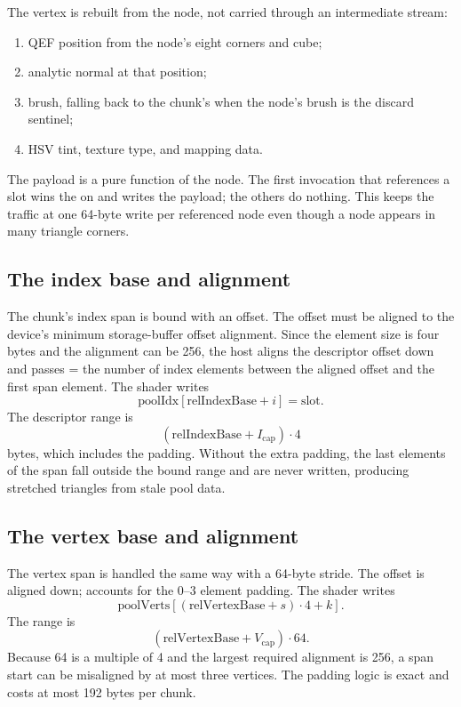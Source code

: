 The vertex is rebuilt from the node, not carried through an intermediate
stream:
\begin{enumerate}
\item QEF position from the node's eight corners and cube;
\item analytic normal at that position;
\item brush, falling back to the chunk's  when the node's
   brush is the discard sentinel;
\item HSV tint, texture type, and mapping data.
\end{enumerate}
The payload is a pure function of the node.  The first invocation that
references a slot wins the  on  and
writes the payload; the others do nothing.  This keeps the traffic at one
64-byte write per referenced node even though a node appears in many
triangle corners.

\subsection{The index base and alignment}

The chunk's index span is bound with an offset.  The offset must be aligned
to the device's minimum storage-buffer offset alignment.  Since the element
size is four bytes and the alignment can be 256, the host aligns the
descriptor offset down and passes  = the number of index
elements between the aligned offset and the first span element.  The shader
writes
\begin{equation}
  \text{poolIdx}[\text{relIndexBase} + i] = \text{slot}.
\end{equation}
The descriptor range is
\begin{equation}
  (\text{relIndexBase} + I_{\text{cap}})\cdot4
\end{equation}
bytes, which includes the padding.  Without the extra padding, the last
elements of the span fall outside the bound range and are never written,
producing stretched triangles from stale pool data.

\subsection{The vertex base and alignment}

The vertex span is handled the same way with a 64-byte stride.  The offset
is aligned down;  accounts for the 0--3 element
padding.  The shader writes
\begin{equation}
  \text{poolVerts}[(\text{relVertexBase} + s)\cdot4 + k].
\end{equation}
The range is
\begin{equation}
  (\text{relVertexBase} + V_{\text{cap}})\cdot64.
\end{equation}
Because 64 is a multiple of 4 and the largest required alignment is 256, a
span start can be misaligned by at most three vertices.  The padding logic
is exact and costs at most 192 bytes per chunk.

